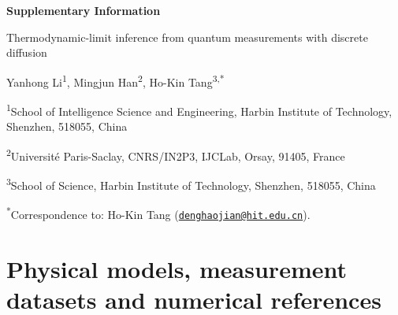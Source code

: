 \documentclass[11pt,a4paper]{article}
\newcommand{\sechead}[2]{\section{#2}}
\begin{document}
\begin{center}
{\LARGE\bfseries Supplementary Information}\par
\vspace{0.5em}
{\large Thermodynamic-limit inference from quantum measurements with discrete diffusion}\par
\vspace{0.5em}

\vspace{0.35em}
Yanhong Li\textsuperscript{1},
Mingjun Han\textsuperscript{2},
Ho-Kin Tang\textsuperscript{3,*}\par
\vspace{0.5em}
{\small
\textsuperscript{1}School of Intelligence Science and Engineering, Harbin Institute of Technology, Shenzhen, 518055, China\par
\textsuperscript{2}Université Paris-Saclay, CNRS/IN2P3, IJCLab, Orsay, 91405, France\par
\textsuperscript{3}School of Science, Harbin Institute of Technology, Shenzhen, 518055, China\par
\vspace{0.35em}
\textsuperscript{*}Correspondence to: Ho-Kin Tang
(\href{mailto:denghaojian@hit.edu.cn}{\nolinkurl{denghaojian@hit.edu.cn}}).\par
}
\end{center}

\tableofcontents
\clearpage

\sechead{S1}{Physical models, measurement datasets and numerical references}
\label{supp:models_data}
\end{document}
